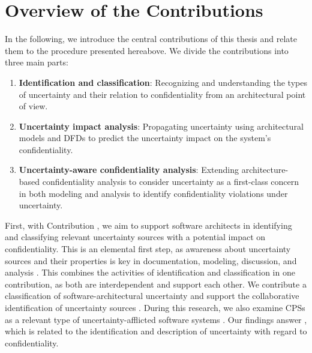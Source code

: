 




\section{Overview of the Contributions}%
\label{sec:overview:contributions}

In the following, we introduce the central contributions of this thesis and relate them to the procedure presented hereabove.
We divide the contributions into three main parts:

\begin{enumerate}[label=\textbf{C\arabic*}]
    \item \textbf{Identification and classification}: Recognizing and understanding the types of uncertainty and their relation to confidentiality from an architectural point of view.
    \item \textbf{Uncertainty impact analysis}: Propagating uncertainty using architectural models and \acp{DFD} to predict the uncertainty impact on the system's confidentiality.
    \item \textbf{Uncertainty-aware confidentiality analysis}: Extending architecture-based confidentiality analysis to consider uncertainty as a first-class concern in both modeling and analysis to identify confidentiality violations under uncertainty.
\end{enumerate}

First, with Contribution , we aim to support software architects in identifying and classifying relevant uncertainty sources with a potential impact on confidentiality.
This is an elemental first step, as awareness about uncertainty sources and their properties is key in documentation, modeling, discussion, and analysis \cite{garlan_unknown_2021}.
This combines the activities of identification and classification in one contribution, as both are interdependent and support each other.
We contribute a classification of software-architectural uncertainty \cite{hahner_classification_2023} and support the collaborative identification of uncertainty sources \cite{hahner_arcn_2024}.
During this research, we also examine \acfp{CPS} as a relevant type of uncertainty-afflicted software systems \cite{acosta_uncertainty_2022}.
Our findings answer , which is related to the identification and description of uncertainty with regard to confidentiality.

